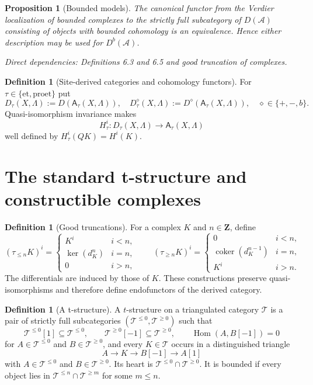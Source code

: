 \documentclass[10pt]{article}
\newtheorem{proposition}[theorem]{Proposition}
\theoremstyle{definition}
\newtheorem{definition}[theorem]{Definition}
\newcommand{\Lam}{\Lambda}
\newcommand{\et}{\mathrm{et}}
\newcommand{\proet}{\mathrm{proet}}
\newcommand{\Hom}{\operatorname{Hom}}
\newcommand{\dep}[1]{\par\smallskip\noindent\textit{Direct dependencies: #1}}
\begin{document}
\begin{proposition}[Bounded models]
The canonical functor from the Verdier localization of bounded complexes to
the strictly full subcategory of $D(\mathcal A)$ consisting of objects with
bounded cohomology is an equivalence.  Hence either description may be used
for $D^b(\mathcal A)$.
\dep{Definitions 6.3 and 6.5 and good truncation of complexes.}
\end{proposition}

\begin{definition}[Site-derived categories and cohomology functors]
For $\tau\in\{\et,\proet\}$ put
\[
D_\tau(X,\Lam):=D(\mathsf A_\tau(X,\Lam)),
\quad
D_\tau^\diamond(X,\Lam):=D^\diamond(\mathsf A_\tau(X,\Lam)),
\quad \diamond\in\{+,-,b\}.
\]
Quasi-isomorphism invariance makes
\[
H^i_\tau:D_\tau(X,\Lam)\longrightarrow\mathsf A_\tau(X,\Lam)
\]
well defined by $H^i_\tau(QK)=H^i(K)$.
\end{definition}

\section{The standard t-structure and constructible complexes}

\begin{definition}[Good truncations]
For a complex $K$ and $n\in\mathbf Z$, define
\[
(\tau_{\le n}K)^i=
\begin{cases}
K^i&i<n,\\
\ker(d_K^n)&i=n,\\
0&i>n,
\end{cases}
\qquad
(\tau_{\ge n}K)^i=
\begin{cases}
0&i<n,\\
\operatorname{coker}(d_K^{n-1})&i=n,\\
K^i&i>n.
\end{cases}
\]
The differentials are induced by those of $K$.  These constructions preserve
quasi-isomorphisms and therefore define endofunctors of the derived category.
\end{definition}

\begin{definition}[A t-structure]
A $t$-structure on a triangulated category $\mathcal T$ is a pair of strictly
full subcategories $(\mathcal T^{\le0},\mathcal T^{\ge0})$ such that
\[
\mathcal T^{\le0}[1]\subseteq\mathcal T^{\le0},\qquad
\mathcal T^{\ge0}[-1]\subseteq\mathcal T^{\ge0},\qquad
\Hom(A,B[-1])=0
\]
for $A\in\mathcal T^{\le0}$ and $B\in\mathcal T^{\ge0}$, and every
$K\in\mathcal T$ occurs in a distinguished triangle
\[
A\longrightarrow K\longrightarrow B[-1]\longrightarrow A[1]
\]
with $A\in\mathcal T^{\le0}$ and $B\in\mathcal T^{\ge0}$.  Its heart is
$\mathcal T^{\le0}\cap\mathcal T^{\ge0}$.  It is bounded if every object lies
in $\mathcal T^{\le n}\cap\mathcal T^{\ge m}$ for some $m\le n$.
\end{definition}
\end{document}
